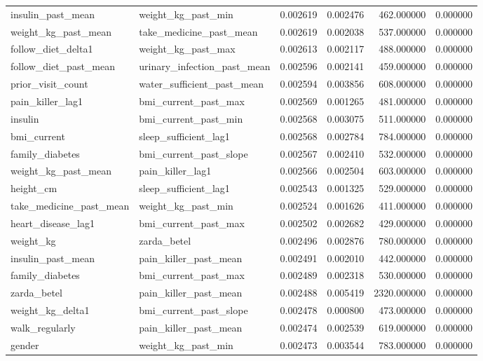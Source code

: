 \begin{longtable}{llrrrr}
insulin\_past\_mean & weight\_kg\_past\_min & 0.002619 & 0.002476 & 462.000000 & 0.000000 \\
weight\_kg\_past\_mean & take\_medicine\_past\_mean & 0.002619 & 0.002038 & 537.000000 & 0.000000 \\
follow\_diet\_delta1 & weight\_kg\_past\_max & 0.002613 & 0.002117 & 488.000000 & 0.000000 \\
follow\_diet\_past\_mean & urinary\_infection\_past\_mean & 0.002596 & 0.002141 & 459.000000 & 0.000000 \\
prior\_visit\_count & water\_sufficient\_past\_mean & 0.002594 & 0.003856 & 608.000000 & 0.000000 \\
pain\_killer\_lag1 & bmi\_current\_past\_max & 0.002569 & 0.001265 & 481.000000 & 0.000000 \\
insulin & bmi\_current\_past\_min & 0.002568 & 0.003075 & 511.000000 & 0.000000 \\
bmi\_current & sleep\_sufficient\_lag1 & 0.002568 & 0.002784 & 784.000000 & 0.000000 \\
family\_diabetes & bmi\_current\_past\_slope & 0.002567 & 0.002410 & 532.000000 & 0.000000 \\
weight\_kg\_past\_mean & pain\_killer\_lag1 & 0.002566 & 0.002504 & 603.000000 & 0.000000 \\
height\_cm & sleep\_sufficient\_lag1 & 0.002543 & 0.001325 & 529.000000 & 0.000000 \\
take\_medicine\_past\_mean & weight\_kg\_past\_min & 0.002524 & 0.001626 & 411.000000 & 0.000000 \\
heart\_disease\_lag1 & bmi\_current\_past\_max & 0.002502 & 0.002682 & 429.000000 & 0.000000 \\
weight\_kg & zarda\_betel & 0.002496 & 0.002876 & 780.000000 & 0.000000 \\
insulin\_past\_mean & pain\_killer\_past\_mean & 0.002491 & 0.002010 & 442.000000 & 0.000000 \\
family\_diabetes & bmi\_current\_past\_max & 0.002489 & 0.002318 & 530.000000 & 0.000000 \\
zarda\_betel & pain\_killer\_past\_mean & 0.002488 & 0.005419 & 2320.000000 & 0.000000 \\
weight\_kg\_delta1 & bmi\_current\_past\_slope & 0.002478 & 0.000800 & 473.000000 & 0.000000 \\
walk\_regularly & pain\_killer\_past\_mean & 0.002474 & 0.002539 & 619.000000 & 0.000000 \\
gender & weight\_kg\_past\_min & 0.002473 & 0.003544 & 783.000000 & 0.000000 \\

\end{longtable}
